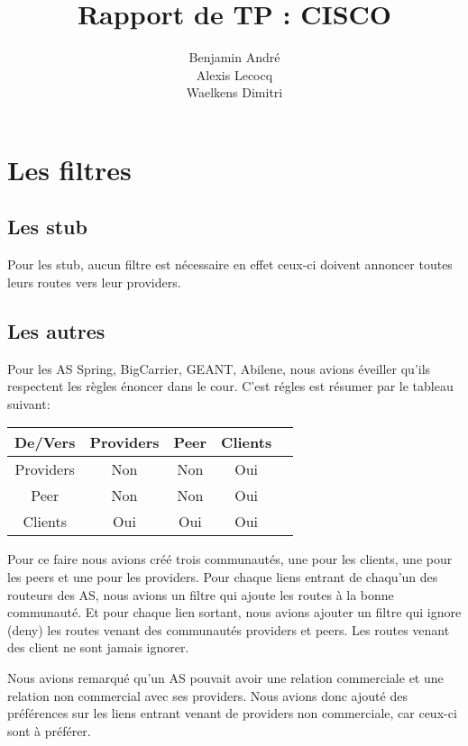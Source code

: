 \documentclass{article}
\author{Benjamin André\\Alexis Lecocq\\Waelkens Dimitri}
\title{Rapport de TP : CISCO}
\begin{document}
\maketitle


\section{Les filtres}

\subsection{Les stub}
Pour les stub, aucun filtre est nécessaire en effet ceux-ci doivent annoncer toutes leurs routes vers leur providers.

\subsection{Les autres}

Pour les AS Spring, BigCarrier, GEANT, Abilene, nous avions éveiller qu'ils respectent les règles énoncer dans le cour. C'est régles est résumer par le tableau suivant:



\begin{tabular}{|c|c|c|c|c|}
\hline
De/Vers & Providers & Peer & Clients \\
\hline
 Providers & Non & Non & Oui \\
\hline
 Peer & Non & Non & Oui \\
\hline
  Clients & Oui & Oui & Oui \\
\hline

\end{tabular}

Pour ce faire nous avions créé trois communautés, une pour les clients, une pour les peers et une pour les providers. Pour chaque liens entrant de chaqu'un des routeurs des AS, nous avions un filtre qui ajoute les routes à la bonne communauté.
Et pour chaque lien sortant, nous avions ajouter un filtre qui ignore (deny) les routes venant des communautés providers et peers.
Les routes venant des client ne sont jamais ignorer.

Nous avions remarqué qu'un AS pouvait avoir une relation commerciale et une relation non commercial avec ses providers. Nous avions donc ajouté des préférences sur les liens entrant venant de providers non commerciale, car ceux-ci sont à préférer.
\end{document}
